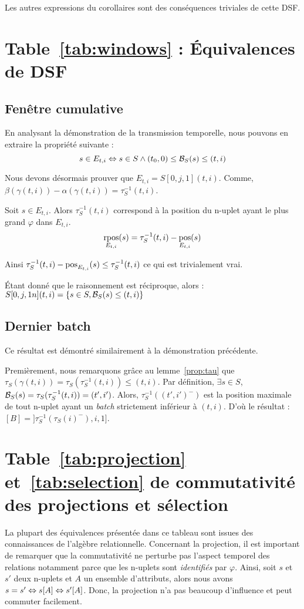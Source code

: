 Les autres expressions du corollaires sont des conséquences triviales de cette DSF.
\findemo

\section{Table~\ref{tab:windows} : Équivalences de DSF}
\subsection{Fenêtre cumulative}
En analysant la démonstration de la transmission temporelle, nous pouvons en extraire la propriété suivante :
$$s\in E_{t,i} \Leftrightarrow s\in S \wedge (t_0,0) \leq \mathcal{B}_S(s) \leq (t,i)$$

Nous devons désormais prouver que $E_{t,i} = S[0,j,1](t,i)$. Comme, $\beta(\gamma(t,i)) - \alpha(\gamma(t,i)) = \tau_S^{-1}(t,i)$.

Soit $s \in E_{t,i}$. Alors $\tau_S^{-1}(t,i)$ correspond à la position du n-uplet ayant le plus grand $\varphi$ dans $E_{t,i}$.
$$\mathop{\mathrm{rpos}}_{E_{t,i}}(s) = \tau_S^{-1}(t,i) - \mathop{\mathrm{pos}}_{E_{t,i}}(s)$$

Ainsi $\tau_S^{-1}(t,i) - \mathop{\mathrm{pos}}_{E_{t,i}}(s) \leq \tau_S^{-1}(t,i)$ ce qui est trivialement vrai.

Étant donné que le raisonnement est réciproque, alors : $S[0,j,1n](t,i) = \{s\in S, \mathcal{B}_S(s) \leq (t,i)\}$
\findemo
\subsection{Dernier batch}
Ce résultat est démontré similairement à la démonstration précédente.

Premièrement, nous remarquons grâce au lemme~\ref{prop:tau} que $\tau_S(\gamma(t,i)) = \tau_S(\tau_S^{-1}(t,i)) \leq (t,i)$. Par définition, $\exists s\in S$, $\mathcal{B}_S(s)=\tau_S(\tau_S^{-1}(t,i)) = (t',i')$. Alors, $\tau_S^{-1}((t',i')^-)$ est la position maximale de tout n-uplet ayant un \textit{batch} strictement inférieur à $(t,i)$. D'où le résultat : $[B]=]\tau_S^{-1}(\tau_S(i)^-),i,1]$.
\findemo

\section{Table~\ref{tab:projection} et~\ref{tab:selection} de commutativité des projections et sélection}
La plupart des équivalences présentée dans ce tableau sont issues des connaissances de l'algèbre relationnelle. Concernant la projection, il est important de remarquer que la commutativité ne perturbe pas l'aspect temporel des relations notamment parce que les n-uplets sont \textit{identifiés} par $\varphi$. Ainsi, soit $s$ et $s'$ deux n-uplets et $A$ un ensemble d'attributs, alors nous avons $s = s' \Leftrightarrow s[A] \Leftrightarrow s'[A]$. Donc, la projection n'a pas beaucoup d'influence et peut commuter facilement.

